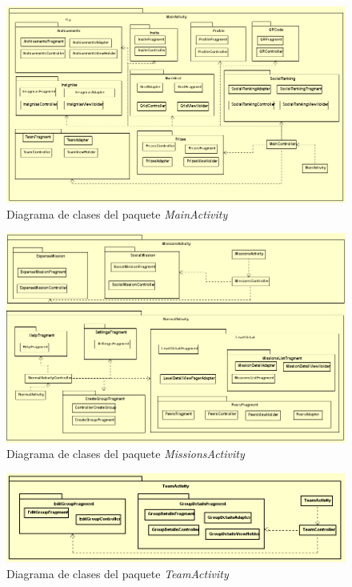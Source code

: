 \documentclass[twoside]{report}
\begin{document}
\begin{figure}[H]
\centering
\includegraphics[scale=0.6]{images/structureMainActivity}
\caption{Diagrama de clases del paquete \textit{MainActivity}}
\end{figure}

\begin{figure}[H]
\centering
\includegraphics[scale=0.7]{images/structureMissions}
\caption{Diagrama de clases del paquete \textit{MissionsActivity}}
\end{figure}


\begin{figure}[H]
\centering
\includegraphics[scale=0.6]{images/structureTeam}
\caption{Diagrama de clases del paquete \textit{TeamActivity}}
\end{figure}
\end{document}
